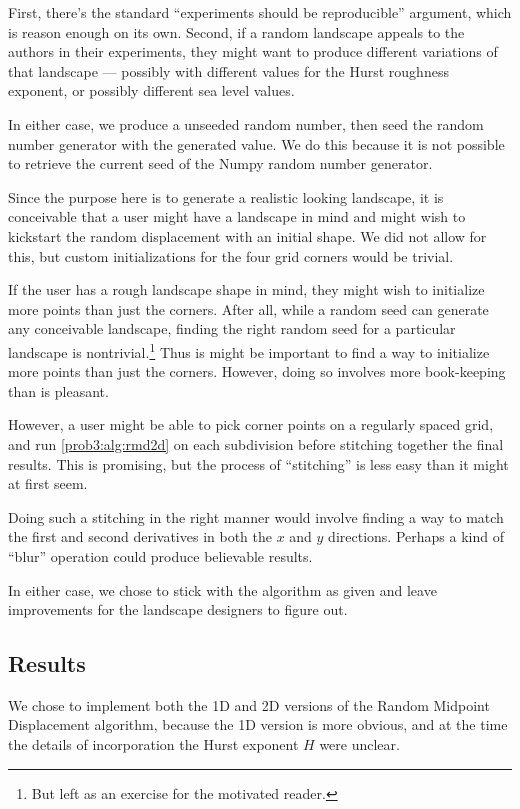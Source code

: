 First, there's the standard ``experiments should be reproducible'' argument, which is reason enough on its own.
Second, if a random landscape appeals to the authors in their experiments, they might want to produce different variations of that landscape --- possibly with different values for the Hurst roughness exponent, or possibly different sea level values.

In either case, we produce a unseeded random number, then seed the random number generator with the generated value.
We do this because it is not possible to retrieve the current seed of the Numpy random number generator.

Since the purpose here is to generate a realistic looking landscape, it is conceivable that a user might have a landscape in mind and might wish to kickstart the random displacement with an initial shape.
We did not allow for this, but custom initializations for the four grid corners would be trivial.

If the user has a rough landscape shape in mind, they might wish to initialize more points than just the corners.
After all, while a random seed can generate any conceivable landscape, finding the right random seed for a particular landscape is nontrivial.\footnote{But left as an exercise for the motivated reader.}
Thus is might be important to find a way to initialize more points than just the corners.
However, doing so involves more book-keeping than is pleasant.

However, a user might be able to pick corner points on a regularly spaced grid, and run \autoref{prob3:alg:rmd2d} on each subdivision before stitching together the final results.
This is promising, but the process of ``stitching'' is less easy than it might at first seem.

Doing such a stitching in the right manner would involve finding a way to match the first and second derivatives in both the $x$ and $y$ directions.
Perhaps a kind of ``blur'' operation could produce believable results.

In either case, we chose to stick with the algorithm as given and leave improvements for the landscape designers to figure out.

\subsection{Results}
We chose to implement both the 1D and 2D versions of the Random Midpoint Displacement algorithm, because the 1D version is more obvious, and at the time the details of incorporation the Hurst exponent $H$ were unclear.

